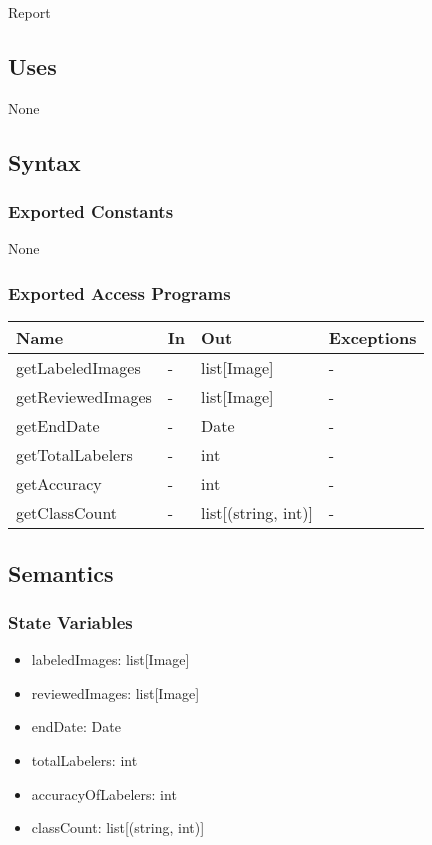 \documentclass[12pt, titlepage]{article}
\begin{document}
Report

\subsection{Uses}
None

\subsection{Syntax}

\subsubsection{Exported Constants}
None
\subsubsection{Exported Access Programs}

\begin{center}
\begin{tabular}{p{3.2cm} p{4cm} p{4cm} p{2cm}}
\hline
\textbf{Name} & \textbf{In} & \textbf{Out} & \textbf{Exceptions} \\
\hline
getLabeledImages & - & list[Image] & - \\
getReviewedImages & - & list[Image] & - \\
getEndDate & - & Date & - \\
getTotalLabelers & - & int & - \\
getAccuracy & - & int & - \\
getClassCount & - & list[(string, int)] & - \\
\hline
\end{tabular}
\end{center}

\subsection{Semantics}

\subsubsection{State Variables}
\begin{itemize}
    \item labeledImages: list[Image]
    \item reviewedImages: list[Image]
    \item endDate: Date
    \item totalLabelers: int
    \item accuracyOfLabelers: int
    \item classCount: list[(string, int)]
\end{itemize}
\end{document}
